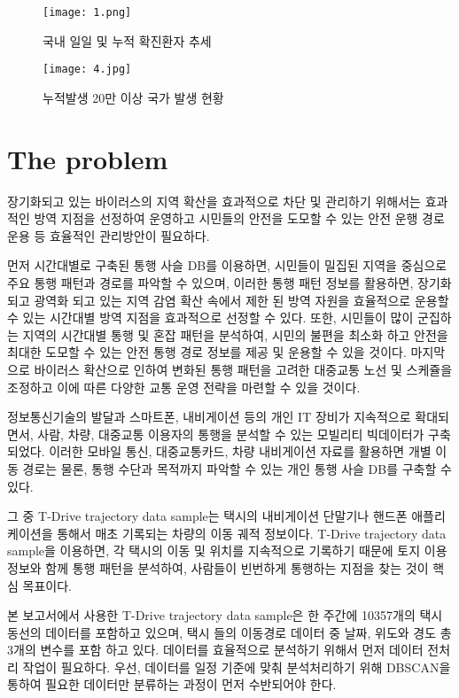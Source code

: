 \documentclass[10pt,journal,compsoc]{IEEEtran}
\begin{document}
\begin{figure*}[htp] 
    \centering
    \texttt{[image: 1.png]} 
    \caption{국내 일일 및 누적 확진환자 추세} 
    \label{fig:1} 
\end{figure*}

\begin{figure*}[htp] 
    \centering
    \texttt{[image: 4.jpg]} 
    \caption{누적발생 20만 이상 국가 발생 현황} 
    \label{fig:2} 
\end{figure*}

\section{The problem}

장기화되고 있는 바이러스의 지역 확산을 효과적으로 차단 및 관리하기 위해서는 효과적인 방역 지점을 선정하여 운영하고 시민들의 안전을 도모할 수 있는 안전 운행 경로 운용 등 효율적인 관리방안이 필요하다.
 
먼저 시간대별로 구축된 통행 사슬 DB를 이용하면,
시민들이 밀집된 지역을 중심으로 주요 통행 패턴과 경로를 파악할 수 있으며, 이러한 통행 패턴 정보를 활용하면, 장기화 되고 광역화 되고 있는 지역 감염 확산 속에서 제한 된 방역 자원을 효율적으로 운용할 수 있는 시간대별 방역 지점을 효과적으로 선정할 수 있다. 또한, 시민들이 많이 군집하는 지역의 시간대별 통행 및 혼잡 패턴을 분석하여, 시민의 불편을 최소화 하고 안전을 최대한 도모할 수 있는 안전 통행 경로 정보를 제공 및 운용할 수 있을 것이다. 마지막으로 바이러스 확산으로 인하여 변화된 통행 패턴을 고려한 대중교통 노선 및 스케쥴을 조정하고 이에 따른 다양한 교통 운영 전략을 마련할 수 있을 것이다.

정보통신기술의 발달과 스마트폰, 내비게이션 등의 개인 IT 장비가 지속적으로 확대되면서, 사람, 차량, 대중교통 이용자의 통행을 분석할 수 있는 모빌리티 빅데이터가 구축되었다. 이러한 모바일 통신, 대중교통카드, 차량 내비게이션 자료를 활용하면 개별 이동 경로는 물론, 통행 수단과 목적까지 파악할 수 있는 개인 통행 사슬 DB를 구축할 수 있다. 

그 중 T-Drive trajectory data sample는 택시의 내비게이션 단말기나 핸드폰 애플리케이션을 통해서 매초 기록되는 차량의 이동 궤적 정보이다. T-Drive trajectory data sample을 이용하면, 각 택시의 이동 및 위치를 지속적으로 기록하기 때문에 토지 이용 정보와 함께 통행 패턴을 분석하여, 사람들이 빈번하게 통행하는 지점을 찾는 것이 핵심 목표이다. 

본 보고서에서 사용한 T-Drive trajectory data sample은 한 주간에 10357개의 택시 동선의 데이터를 포함하고 있으며, 택시 들의 이동경로 데이터 중 날짜, 위도와 경도 총 3개의 변수를 포함 하고 있다. 데이터를 효율적으로 분석하기 위해서 먼저 데이터 전처리 작업이 필요하다. 우선, 데이터를 일정 기준에 맞춰 분석처리하기 위해 DBSCAN을 통하여 필요한 데이터만 분류하는 과정이 먼저 수반되어야 한다.
\end{document}
